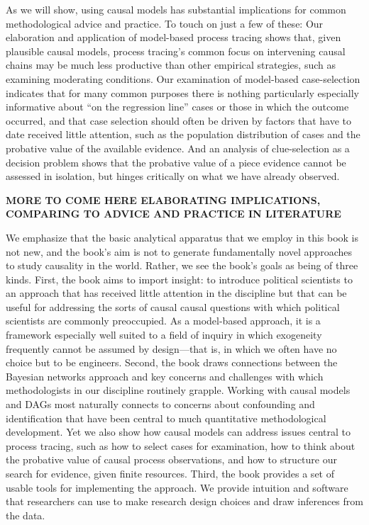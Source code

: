 \documentclass[12pt,]{book}
\begin{document}
As we will show, using causal models has substantial implications for common methodological advice and practice. To touch on just a few of these: Our elaboration and application of model-based process tracing shows that, given plausible causal models, process tracing's common focus on intervening causal chains may be much less productive than other empirical strategies, such as examining moderating conditions. Our examination of model-based case-selection indicates that for many common purposes there is nothing particularly especially informative about ``on the regression line'' cases or those in which the outcome occurred, and that case selection should often be driven by factors that have to date received little attention, such as the population distribution of cases and the probative value of the available evidence. And an analysis of clue-selection as a decision problem shows that the probative value of a piece evidence cannot be assessed in isolation, but hinges critically on what we have already observed.

\textbf{MORE TO COME HERE ELABORATING IMPLICATIONS, COMPARING TO ADVICE AND PRACTICE IN LITERATURE}

We emphasize that the basic analytical apparatus that we employ in this book is not new, and the book's aim is not to generate fundamentally novel approaches to study causality in the world. Rather, we see the book's goals as being of three kinds. First, the book aims to import insight: to introduce political scientists to an approach that has received little attention in the discipline but that can be useful for addressing the sorts of causal causal questions with which political scientists are commonly preoccupied. As a model-based approach, it is a framework especially well suited to a field of inquiry in which exogeneity frequently cannot be assumed by design---that is, in which we often have no choice but to be engineers. Second, the book draws connections between the Bayesian networks approach and key concerns and challenges with which methodologists in our discipline routinely grapple. Working with causal models and DAGs most naturally connects to concerns about confounding and identification that have been central to much quantitative methodological development. Yet we also show how causal models can address issues central to process tracing, such as how to select cases for examination, how to think about the probative value of causal process observations, and how to structure our search for evidence, given finite resources. Third, the book provides a set of usable tools for implementing the approach. We provide intuition and software that researchers can use to make research design choices and draw inferences from the data.
\end{document}
